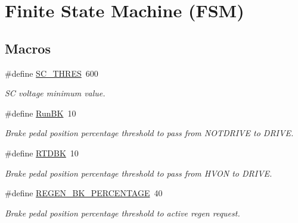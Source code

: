 \hypertarget{group__stages__group}{}\section{Finite State Machine (F\+SM)}
\label{group__stages__group}
\subsection*{Macros}
\begin{DoxyCompactItemize}
\item 
\mbox{\label{group__stages__group_ga9688af4f17ae88b4d149269d71b7ff1f}} 
\#define \mbox{\hyperlink{group__stages__group_ga9688af4f17ae88b4d149269d71b7ff1f}{S\+C\+\_\+\+T\+H\+R\+ES}}~600
\begin{DoxyCompactList}\small\item\em SC voltage minimum value. \end{DoxyCompactList}\item 
\mbox{\label{group__stages__group_ga83586e8309ed2076018ef686b6154a78}} 
\#define \mbox{\hyperlink{group__stages__group_ga83586e8309ed2076018ef686b6154a78}{Run\+BK}}~10
\begin{DoxyCompactList}\small\item\em Brake pedal position percentage threshold to pass from N\+O\+T\+D\+R\+I\+VE to D\+R\+I\+VE. \end{DoxyCompactList}\item 
\mbox{\label{group__stages__group_ga87841f6a3eeb660263b624e20c4f072f}} 
\#define \mbox{\hyperlink{group__stages__group_ga87841f6a3eeb660263b624e20c4f072f}{R\+T\+D\+BK}}~10
\begin{DoxyCompactList}\small\item\em Brake pedal position percentage threshold to pass from H\+V\+ON to D\+R\+I\+VE. \end{DoxyCompactList}\item 
\mbox{\label{group__stages__group_ga5d31d58edb14312cf64a13efd7abfca2}} 
\#define \mbox{\hyperlink{group__stages__group_ga5d31d58edb14312cf64a13efd7abfca2}{R\+E\+G\+E\+N\+\_\+\+B\+K\+\_\+\+P\+E\+R\+C\+E\+N\+T\+A\+GE}}~40
\begin{DoxyCompactList}\small\item\em Brake pedal position percentage threshold to active regen request. \end{DoxyCompactList}\end{DoxyCompactItemize}
